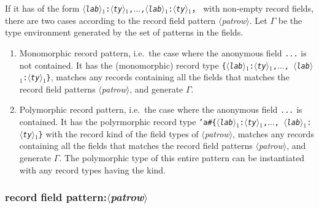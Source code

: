 \documentclass{jbook}
\newcommand{\txt}[2]{#2}
\newcommand{\code}[1]{\mbox{\large\tt #1}}
\newcommand{\nonterm}[1]{\mbox{$\langle$}{\it #1}\mbox{$\rangle$}}
\newcommand{\ass}{\Gamma}
\begin{document}
	If it has of the form 
\code{\nonterm{lab}$_1$:\nonterm{ty}$_1$,$\ldots$,\nonterm{lab}$_1$:\nonterm{ty}$_1$}，
with non-empty record fields, there are two cases according to the
record field pattern \nonterm{patrow}.
	Let $\ass$ be the type environment generated by the set of
patterns in the fields.
\begin{enumerate}
\item Monomorphic record pattern, i.e.\ the case where the anonymous
field \verb|...| is not contained.
	It has the (monomorphic) record type
\code{\{\nonterm{lab}$_1$:\nonterm{ty}$_1$,$\ldots$,
\nonterm{lab}$_1$:\nonterm{ty}$_1$\}}, matches any records
containing all the fields that matches the record field patterns \nonterm{patrow},
and generate $\ass$.

\item Polymorphic record pattern, i.e.\ the case where the anonymous
field \verb|...| is contained.
	It has the polyrmorphic record type 
\code{'a\#\{\nonterm{lab}$_1$:\nonterm{ty}$_1$,$\ldots$,
\nonterm{lab}$_1$:\nonterm{ty}$_1$\}}
with the record kind of the field types of \nonterm{patrow}, 
matches any records
containing all the fields that matches the record field patterns \nonterm{patrow},
and generate $\ass$.
	The polymorphic type of this entire pattern can be instantiated
with any record types having the kind.
\end{enumerate}
\fi%

\subsubsection{\txt{レコードフィールドパターン}{record field pattern}:\nonterm{patrow}}
\end{document}
